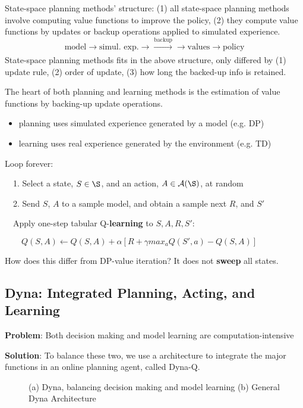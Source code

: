 \documentclass[sutton_barto_notes.tex]{subfiles}
\begin{document}
State-space planning methods' structure: (1) all state-space planning methods involve computing value functions to improve the policy, (2) they compute value functions by updates or backup operations applied to simulated experience.
$$ \text{model} \rightarrow \text{simul. exp.} \rightarrow \xrightarrow[]{\text{backup}} \rightarrow \text{values} \rightarrow \text{policy} $$
State-space planning methods fits in the above structure, only differed by (1) update rule, (2) order of update, (3) how long the backed-up info is retained.

The heart of both planning and learning methods is the estimation of value functions by backing-up update operations.
\begin{itemize}
\item planning uses simulated experience generated by a model (e.g. DP)
\item learning uses real experience generated by the environment (e.g. TD)
\end{itemize}


\begin{tcolorbox}[width=1.1\textwidth,title={Random-sample one-step tabular Q-\textbf{planning}}]
Loop forever:

$\quad$1. Select a state, $S \in \S$, and an action, $A \in \A(\S)$, at random

$\quad$2. Send $S$, $A$ to a sample model, and obtain a sample next $R$, and $S'$

$\quad$Apply one-step tabular Q-\textbf{learning} to $S,A,R,S'$:

$\quad\quad Q(S,A)\leftarrow Q(S,A) + \alpha [R + \gamma max_a Q(S',a) - Q(S,A)]$
\end{tcolorbox}

How does this differ from DP-value iteration? It does not \textbf{sweep} all states.


\subsection{Dyna: Integrated Planning, Acting, and Learning}

\textbf{Problem}: Both decision making and model learning are computation-intensive

\textbf{Solution}: To balance these two, we use a architecture to integrate the major functions in an online planning agent, called Dyna-Q.

\begin{figure}[!h]
    \centering
    \caption{ (a) Dyna, balancing decision making and model learning (b) General Dyna Architecture }
    \label{fig:dyna}
\end{figure}
\end{document}
